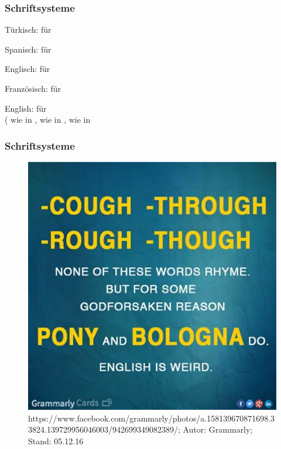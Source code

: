 \begin{frame}
\frametitle{Schriftsysteme}


	Türkisch:  für \textipa{[dYkkan]}
	
	Spanisch:  für \textipa{[negoTio]}
	
	Englisch:  für \textipa{[bIzn@z]}
	
	Französisch:  für \textipa{[butik]}
	
\pause	
	
	English:  für  \\
	( wie in ,  wie in ,  wie in 
	


\end{frame}



\begin{frame}
\frametitle{Schriftsysteme}


\begin{figure}
\centering
	\includegraphics[scale=.3]{material/04GraphEnglischPGK}
	\caption[EnglischPGK]{https://www.facebook.com/grammarly/photos/a.158139670871698.33824.139729956046003/942699349082389/; Autor: Grammarly; Stand: 05.12.16}
\end{figure}

\end{frame}


